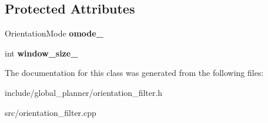 \subsection*{Protected Attributes}
\begin{DoxyCompactItemize}
\item 
\mbox{\label{classglobal__planner_1_1_orientation_filter_a5f155f74ab99402aaaee9f23d8a5741c}} 
Orientation\+Mode {\bfseries omode\+\_\+}
\item 
\mbox{\label{classglobal__planner_1_1_orientation_filter_aed9456a588e42436e590db2a4f0c98dc}} 
int {\bfseries window\+\_\+size\+\_\+}
\end{DoxyCompactItemize}


The documentation for this class was generated from the following files\+:\begin{DoxyCompactItemize}
\item 
include/global\+\_\+planner/orientation\+\_\+filter.\+h\item 
src/orientation\+\_\+filter.\+cpp\end{DoxyCompactItemize}
